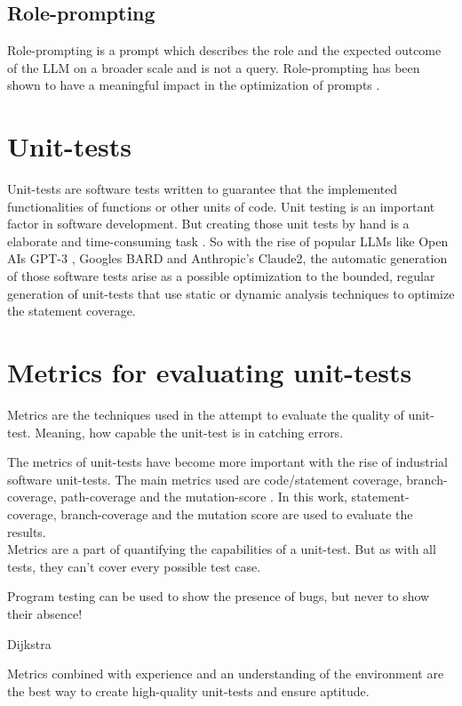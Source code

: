 \documentclass[a4paper,11pt,oneside]{memoir}
\begin{document}
\subsection{Role-prompting}
Role-prompting is a prompt which describes the role and the expected outcome of the LLM on a broader scale and is not a query.
Role-prompting has been shown to have a meaningful impact in the optimization of prompts \cite{kong2024promptRoleplayEffective}.

\section{Unit-tests}
Unit-tests are software tests written to guarantee that the implemented functionalities of functions or other units of code. Unit testing is an important factor in software development. But creating those unit tests by hand is a elaborate and time-consuming task\cite{Daka_unit_tests} \cite{UnitTestAdequacy}. So with the rise of popular LLMs like Open AIs GPT-3 \cite{brown2020languagemodelsfewshotlearners}, Googles BARD and Anthropic’s Claude2, the automatic generation of those software tests arise as a possible optimization to the bounded, regular generation of unit-tests that use static or dynamic analysis techniques to optimize the statement coverage\cite{OverviewUnitTestGeneration2013}. 

\section{Metrics for evaluating unit-tests}
\label{metricsForEvaluationOfUnitTest}
Metrics are the techniques used in the attempt to evaluate the quality of unit-test. Meaning, how capable the unit-test is in catching errors.

The metrics of unit-tests have become more important with the rise of industrial software unit-tests. The main metrics used are code/statement coverage, branch-coverage, path-coverage and the mutation-score \cite{UnitTestAdequacy}.
In this work, statement-coverage, branch-coverage and the mutation score are used to evaluate the results.
\\
Metrics are a part of quantifying the capabilities of a unit-test. But as with all tests, they can't cover every possible test case. 

\epigraph{Program testing can be used to show the presence of bugs, but never to show their absence!}{Dijkstra } 

Metrics combined with experience and an understanding of the environment are the best way to create high-quality unit-tests and ensure aptitude\cite{citation needed}.
\end{document}

